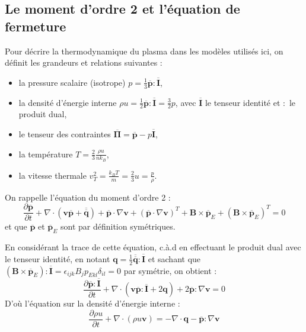 \subsection{Le moment d'ordre 2 et l'équation de fermeture}
\label{ssec-1112}

Pour décrire la thermodynamique du plasma dans les modèles utilisés ici, on définit les grandeurs et relations suivantes : 
\begin{itemize}
 \item la pressure scalaire (isotrope) $p = \frac{1}{3} \overline{\mathbf{p}}:\overline{\mathbf{I}}$,
 \item la densité d'énergie interne $\rho u = \frac{1}{2} \overline{\mathbf{p}}:\overline{\mathbf{I}} = \frac{3}{2} p$, avec $\overline{\mathbf{I}}$ le tenseur identité et $:$ le produit dual,
 \item le tenseur des contraintes $\overline{\mathbf{\Pi}} = \overline{\mathbf{p}} - p\overline{\mathbf{I}}$,
 \item la température $T = \frac{2}{3} \frac{\rho u}{n k_B}$,
 \item la vitesse thermale $v^2_{T} = \frac{k_B T}{m} =  \frac{2}{3} u= \frac{p}{\rho}$.
\end{itemize}  

On rappelle l'équation du moment d'ordre 2 :
\begin{equation}
\frac{\partial \overline{\mathbf{p}}}{\partial t} + \nabla \cdot (\mathbf{v}\overline{\mathbf{p}} + \overline{\overline{\mathbf{q}}}) + \overline{\mathbf{p}} \cdot \nabla \mathbf{v} + (\overline{\mathbf{p}} \cdot \nabla \mathbf{v})^T + \mathbf{B}\times \overline{\mathbf{p}}_E + (\mathbf{B}\times \overline{\mathbf{p}}_E)^T  = 0 
\end{equation}
et que  $\overline{\mathbf{p}}$ et $ \overline{\mathbf{p}}_E$ sont par définition symétriques.

En considérant la trace de cette équation, c.à.d en effectuant le produit dual avec le tenseur identité, en notant $\mathbf{q} = \frac{1}{2} \overline{\overline{\mathbf{q}}}:\overline{\mathbf{I}}$ et sachant que $(\mathbf{B}\times \overline{\mathbf{p}}_E):\overline{\mathbf{I}} = \epsilon_{ijk} B_{j} p_{Ekl} \delta_{il}  = 0 $ par symétrie, on obtient : 
\begin{equation}
\frac{\partial \overline{\mathbf{p}}:\overline{\mathbf{I}}}{\partial t} + \nabla \cdot (\mathbf{v}\overline{\mathbf{p}}:\overline{\mathbf{I}} + 2\mathbf{q}) + 2 \overline{\mathbf{p}} : \nabla \mathbf{v}  = 0 
\end{equation}
D'où l'équation sur la densité d'énergie interne : 
\begin{equation}
\frac{\partial \rho u}{\partial t} + \nabla \cdot (\rho u \mathbf{v}) = - \nabla \cdot \mathbf{q} - \overline{\mathbf{p}} : \nabla \mathbf{v}  \label{eq:en_int}
\end{equation}

